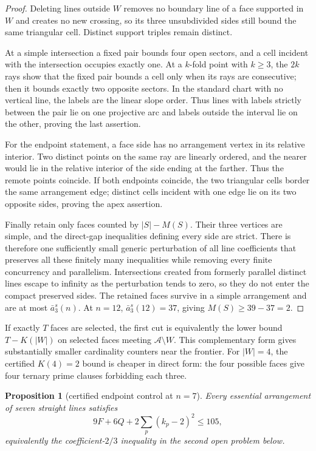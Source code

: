 \documentclass[11pt]{article}
\newtheorem{proposition}[theorem]{Proposition}
\theoremstyle{definition}
\begin{document}
\begin{proof}
Deleting lines outside $W$ removes no boundary line of a face supported in
$W$ and creates no new crossing, so its three unsubdivided sides still bound
the same triangular cell. Distinct support triples remain distinct.

At a simple intersection a fixed pair bounds four open sectors, and a cell
incident with the intersection occupies exactly one. At a $k$-fold point with
$k\ge3$, the $2k$ rays show that the fixed pair bounds a cell only when its
rays are consecutive; then it bounds exactly two opposite sectors. In the
standard chart with no vertical line, the labels are the linear slope order.
Thus lines with labels strictly between the pair lie on one projective arc
and labels outside the interval lie on the other, proving the last assertion.

For the endpoint statement, a face side has no arrangement vertex in its
relative interior. Two distinct points on the same ray are linearly ordered,
and the nearer would lie in the relative interior of the side ending at the
farther. Thus the remote points coincide. If both endpoints coincide, the two
triangular cells border the same arrangement edge; distinct cells incident
with one edge lie on its two opposite sides, proving the apex assertion.

Finally retain only faces counted by $|S|-M(S)$. Their three vertices are
simple, and the direct-gap inequalities defining every side are strict.
There is therefore one sufficiently small generic perturbation of all line
coefficients that preserves all these finitely many inequalities while
removing every finite concurrency and parallelism. Intersections created from
formerly parallel distinct lines escape to infinity as the perturbation tends
to zero, so they do not enter the compact preserved sides. The retained faces
survive in a simple arrangement and are at most $\bar a_3^s(n)$. At $n=12$,
$\bar a_3^s(12)=37$, giving $M(S)\ge39-37=2$.
\end{proof}

If exactly $T$ faces are selected, the first cut is equivalently the lower
bound $T-K(|W|)$ on selected faces meeting
$\mathcal A\setminus W$. This complementary form gives substantially smaller
cardinality counters near the frontier. For $|W|=4$, the certified
$K(4)=2$ bound is cheaper in direct form: the four possible faces give four
ternary prime clauses forbidding each three.

\begin{proposition}[certified endpoint control at $n=7$]\label{prop:c23n7}
Every essential arrangement of seven straight lines satisfies
\[
 9F+6Q+2\sum_p(k_p-2)^2\le105,
\]
equivalently the coefficient-$2/3$ inequality in the second open problem
below.
\end{proposition}
\end{document}

